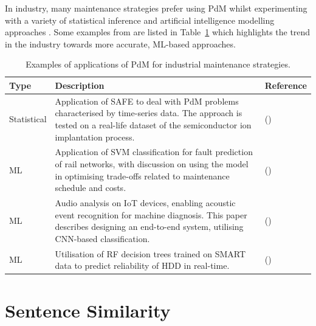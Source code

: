 \documentclass[10pt,oneside]{report}
\begin{document}
In industry, many maintenance strategies prefer using PdM whilst experimenting with a variety of statistical inference and artificial intelligence modelling approaches \cite{mobley2002introduction, jezzini2013effects}. Some examples from \cite{carvalho2019systematic} are listed in Table~\ref{tab:pdmPaperTable} which highlights the trend in the industry towards more accurate, ML-based approaches.

\begin{table}[htbp]
    \fontsize{8}{12}\selectfont
    \centering
    \caption{Examples of applications of PdM for industrial maintenance strategies.}
    \label{tab:pdmPaperTable}
    \begin{adjustbox}{max width=\textwidth}
    \begin{tabular}{p{1.5cm} p{8.5cm} p{3cm}}
        \toprule
        \textbf{Type} & \textbf{Description} & \textbf{Reference} \\
        \midrule
        Statistical & Application of SAFE to deal with PdM problems characterised by time-series data. The approach is tested on a real-life dataset of the semiconductor ion implantation process. & (\citet{susto2016dealing})\\
        ML & Application of SVM classification for fault prediction of rail networks, with discussion on using the model in optimising trade-offs related to maintenance schedule and costs. & (\citet{li2014improving})\\
        ML & Audio analysis on IoT devices, enabling acoustic event recognition for machine diagnosis. This paper describes designing an end-to-end system, utilising CNN-based classification. & (\citet{pan2017cognitive})  \\
        ML & Utilisation of RF decision trees trained on SMART data to predict reliability of HDD in real-time. & (\citet{su2018real}) \\
        \bottomrule
    \end{tabular}
    \end{adjustbox}
\end{table}


\section{Sentence Similarity}\label{sec:sentenceSimilarity}
\end{document}
